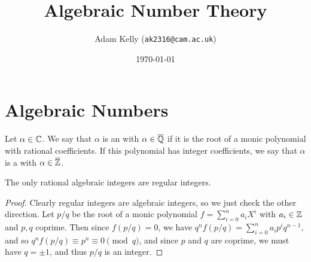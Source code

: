 \documentclass[11pt]{article}
\title{Algebraic Number Theory}
\author{Adam Kelly (\texttt{ak2316@cam.ac.uk})}
\date{\today}
\begin{document}
\maketitle

\section{Algebraic Numbers}

\begin{definition}
	Let $\alpha \in \mathbb{C}$. We say that $\alpha$ is an  with $\alpha \in \overline{\mathbb{Q}}$ if it is the root of a monic polynomial with rational coefficients. If this polynomial has integer coefficients, we say that $\alpha$ is a  with $\alpha \in \overline{\mathbb{Z}}$.
\end{definition}


\begin{proposition}
	The only rational algebraic integers are regular integers. 
\end{proposition}

\begin{proof}
	Clearly regular integers are algebraic integers, so we just check the other direction. Let $p/q$ be the root of a monic polynomial $f = \sum_{i = 0}^n a_i X^i$ with $a_i \in \mathbb{Z}$ and $p, q$ coprime. Then since $f(p/q) = 0$, we have
	$
	q^n f(p/q) = \sum_{i = 0}^n a_i p^i q^{n - 1},
	$
	and so $q^n f(p/q) \equiv p^n \equiv 0 \pmod{q}$, and since $p$ and $q$ are coprime, we must have $q = \pm 1$, and thus $p/q$ is an integer.
\end{proof}
\end{document}

